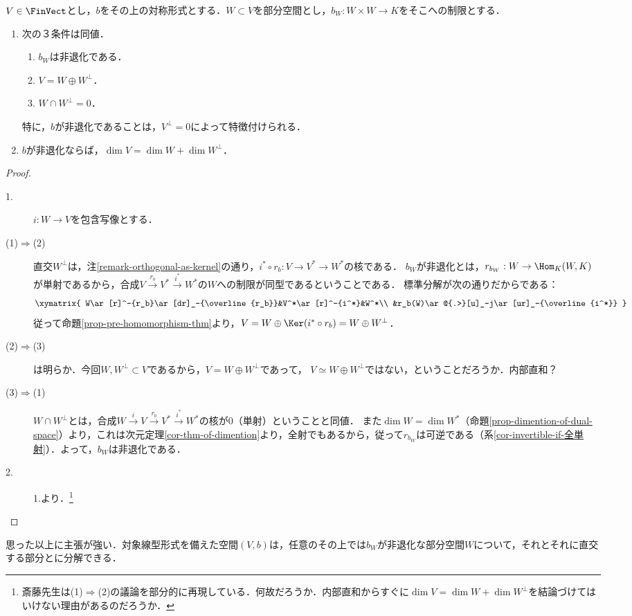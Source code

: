 \documentclass[uplatex, dvipdfmx]{jsreport}
\begin{document}
\begin{proposition}[空間の直交に沿った分解]\label{prop-decomposition-along-orthogonal-space}
    $V\in\FinVect$とし，$b$をその上の対称形式とする．$W\subset V$を部分空間とし，$b_W:W\times W\to K$をそこへの制限とする．
    \begin{enumerate}
        \item 次の３条件は同値．
        \begin{enumerate}[(1)]
            \item $b_W$は非退化である．
            \item $V=W\oplus W^\perp$．
            \item $W\cap W^\perp=0$．
        \end{enumerate}
        特に，$b$が非退化であることは，$V^\perp=0$によって特徴付けられる．
        \item $b$が非退化ならば，$\dim V=\dim W+\dim W^\perp$．
    \end{enumerate}
\end{proposition}
\begin{proof}\mbox{}
    \begin{description}
        \item[1.] $i:W\to V$を包含写像とする．
        \item[(1)$\Rightarrow$(2)]
        直交$W^\perp$は，注\ref{remark-orthogonal-as-kernel}の通り，$i^*\circ r_b:V\to V^*\to W^*$の核である．
        $b_W$が非退化とは，$r_{b_W}:W\to\Hom_K(W,K)$が単射であるから，合成$V\xrightarrow{r_b}V^*\xrightarrow{i^*}W^*$の$W$への制限が同型であるということである．
        標準分解が次の通りだからである：
        \[\xymatrix{
            W\ar[r]^-{r_b}\ar[dr]_-{\overline{r_b}}&V^*\ar[r]^-{i^*}&W^*\\
            &r_b(W)\ar@{.>}[u]_-j\ar[ur]_-{\overline{i^*}}
        }\]
        従って命題\ref{prop-pre-homomorphism-thm}より，$V=W\oplus\Ker (i^*\circ r_b)=W\oplus W^\perp$．
        \item[(2)$\Rightarrow$(3)] は明らか．今回$W,W^\perp\subset V$であるから，$V=W\oplus W^\perp$であって， $V\simeq W\oplus W^\perp$ではない，ということだろうか．内部直和？
        \item[(3)$\Rightarrow$(1)] $W\cap W^\perp$とは，合成$W\xrightarrow{i} V\xrightarrow{r_b}V^*\xrightarrow{i^*}W^*$の核が$0$（単射）ということと同値．
        また$\dim W=\dim W^*$（命題\ref{prop-dimention-of-dual-space}）より，これは次元定理\ref{cor-thm-of-dimention}より，全射でもあるから，従って$r_{b_W}$は可逆である（系\ref{cor-invertible-if-全単射}）．よって，$b_W$は非退化である．
        \item[2.]
        1.より．\footnote{斎藤先生は(1)$\Rightarrow$(2)の議論を部分的に再現している．何故だろうか．内部直和からすぐに$\dim V=\dim W+\dim W^\perp$を結論づけてはいけない理由があるのだろうか．}
    \end{description}
\end{proof}
\begin{remarks}
    思った以上に主張が強い．対象線型形式を備えた空間$(V,b)$は，任意のその上では$b_W$が非退化な部分空間$W$について，それとそれに直交する部分とに分解できる．
\end{remarks}
\end{document}
